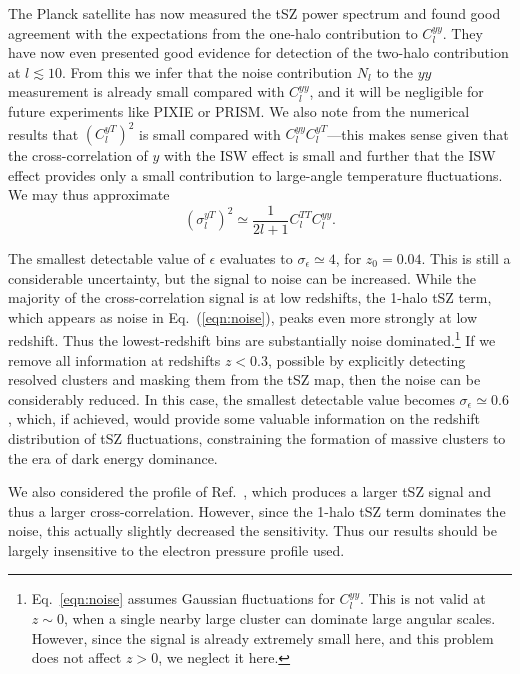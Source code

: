 \documentclass[aps,twocolumn,floats,prd,nofootinbib,10pt,floatfix]{revtex4-1}
\begin{document}
The Planck satellite has now measured the tSZ power spectrum and
found good agreement with the expectations from the one-halo
contribution to $C_l^{yy}$.  They have now even presented good
evidence for detection of the two-halo contribution at
$l\lesssim 10$.  From this we infer that the noise contribution
$N_l$ to the $yy$ measurement is already small compared with
$C_l^{yy}$, and it will be negligible for future experiments
like PIXIE or PRISM.  We also note from the numerical results
that $\left(C_l^{yT}\right)^2$ is small compared with $C_l^{yy}
C_l^{yT}$---this makes sense given that the cross-correlation of
$y$ with the ISW effect is small and further that the ISW effect
provides only a small contribution to large-angle temperature
fluctuations.  We may thus approximate
\begin{equation}
     \left(\sigma_l^{yT} \right)^2 \simeq \frac{1}{2l+1}
     C_l^{TT} C_l^{yy}.
\label{eqn:noiseapprox}     
\end{equation}

The smallest detectable value of $\epsilon$ evaluates to
$\sigma_\epsilon \simeq 4$, for $z_0 = 0.04$. 
This is still a considerable uncertainty, but the signal to noise can be
increased.  While the majority of the cross-correlation signal
is at low redshifts, the 1-halo tSZ term, which appears as noise
in Eq.~(\ref{eqn:noise}), peaks even more strongly at low
redshift. Thus the lowest-redshift bins are substantially noise
dominated.\footnote{Eq.~\ref{eqn:noise} assumes Gaussian fluctuations for $C_l^{yy}$. 
This is not valid at $z\sim 0$, when a single nearby large cluster can dominate large angular scales. 
However, since the signal is already extremely small here, and this 
problem does not affect $z > 0$, we neglect it here.}
If we remove all information at redshifts $z < 0.3$,
possible by explicitly detecting resolved clusters and masking
them from the tSZ map, then the noise can be considerably
reduced.  In this case, the smallest detectable value becomes
$\sigma_\epsilon \simeq 0.6$, which, if achieved, would
provide some valuable information on the redshift distribution
of tSZ fluctuations, constraining the formation of massive clusters 
to the era of dark energy dominance.

We also considered the profile of Ref.~\cite{Komatsu:2002wc}, 
which produces a larger tSZ signal and thus a larger cross-correlation. 
However, since the 1-halo tSZ term dominates the noise, this actually 
slightly decreased the sensitivity. Thus our results should be largely
insensitive to the electron pressure profile used.
\end{document}
